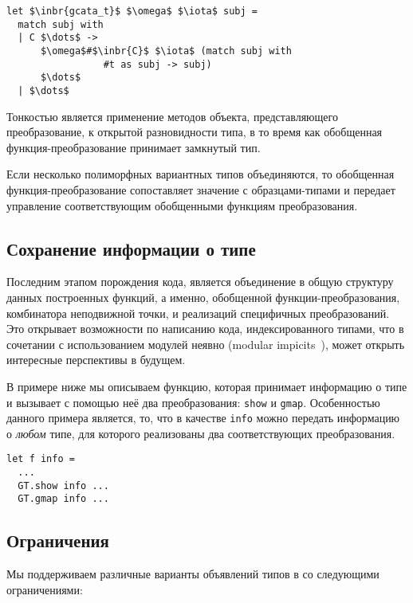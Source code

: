 \begin{lstlisting}
let $\inbr{gcata_t}$ $\omega$ $\iota$ subj =
  match subj with
  | C $\dots$ -> 
      $\omega$#$\inbr{C}$ $\iota$ (match subj with 
                 #t as subj -> subj) 
      $\dots$
  | $\dots$
\end{lstlisting}

Тонкостью является применение методов объекта, представляющего преобразование, к открытой разновидности типа, в то время как обобщенная функция-преобразование принимает замкнутый тип.

Если несколько полиморфных вариантных типов объединяются, то обобщенная функция-преобразование сопоставляет значение с образцами-типами и передает управление соответствующим обобщенными функциям преобразования.

\subsection{Сохранение информации о типе}
\label{typeinfo}

Последним этапом порождения кода, является объединение в общую структуру данных построенных функций, а именно, обобщенной функции-преобразования, комбинатора неподвижной точки, и реализаций специфичных преобразований. Это открывает возможности по написанию кода, индексированного типами, что в сочетании с использованием модулей неявно (modular impicits~\cite{ModularImplicits}), может открыть интересные перспективы в будущем. 

В примере ниже мы описываем функцию, которая принимает информацию о типе и вызывает с помощью неё два преобразования: \lstinline{show} и \lstinline{gmap}.
Особенностью данного примера является, то, что в качестве \lstinline{info} можно передать информацию о \emph{любом} типе, для которого реализованы два соответствующих преобразования.


\begin{lstlisting}
let f info = 
  ... 
  GT.show info ...
  GT.gmap info ...
\end{lstlisting}


\subsection{Ограничения}


Мы поддерживаем различные варианты объявлений типов в  \ocaml{} со следующими ограничениями:

